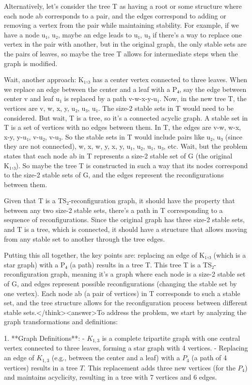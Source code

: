 Alternatively, let's consider the tree T as having a root or some structure where each node ab corresponds to a pair, and the edges correspond to adding or removing a vertex from the pair while maintaining stability. For example, if we have a node {u₁, u₂}, maybe an edge leads to {u₁, u₃} if there's a way to replace one vertex in the pair with another, but in the original graph, the only stable sets are the pairs of leaves, so maybe the tree T allows for intermediate steps when the graph is modified.

Wait, another approach: K₁,₃ has a center vertex connected to three leaves. When we replace an edge between the center and a leaf with a P₄, say the edge between center v and leaf u₁ is replaced by a path v-w-x-y-u₁. Now, in the new tree T, the vertices are v, w, x, y, u₂, u₃, u₁. The size-2 stable sets in T would need to be considered. But wait, T is a tree, so it's a connected acyclic graph. A stable set in T is a set of vertices with no edges between them. In T, the edges are v-w, w-x, x-y, y-u₁, v-u₂, v-u₃. So the stable sets in T would include pairs like {u₂, u₃} (since they are not connected), {w, x}, {w, y}, {x, y}, {u₁, u₂}, {u₁, u₃}, etc. Wait, but the problem states that each node ab in T represents a size-2 stable set of G (the original K₁,₃). So maybe the tree T is constructed in such a way that its nodes correspond to the size-2 stable sets of G, and the edges represent the reconfigurations between them.

Given that T is a TS₂-reconfiguration graph, it should have the property that between any two size-2 stable sets, there's a path in T corresponding to a sequence of reconfigurations. Since the original graph has three size-2 stable sets, and T is a tree, which is connected, it should have a structure that allows moving from any stable set to another through the tree edges.

Putting this all together, the key points are: replacing an edge of K₁,₃ (which is a star graph) with a P₄ (a path) results in a tree T. This tree T is a TS₂-reconfiguration graph, meaning it's a graph where each node is a size-2 stable set of G, and edges represent possible reconfigurations (changing the stable set by one vertex). Each node ab (a pair of vertices) in T corresponds to such a stable set, and the tree structure allows for the reconfiguration process between different stable sets.</think><answer>To address the problem, we start by analyzing the graph transformations and definitions:  

1. **Graph Definitions**:  
   - \( K_{1,3} \) is a complete tripartite graph with one central vertex connected to three leaves, forming a star graph with 4 vertices.  
   - Replacing an edge of \( K_{1,3} \) (e.g., between the center and a leaf) with a \( P_4 \) (a path of 4 vertices) results in a tree \( T \). This replacement adds three new vertices (for the \( P_4 \)) and maintains acyclicity, resulting in a tree with 7 vertices and 6 edges.  

